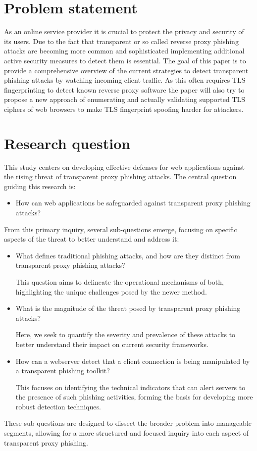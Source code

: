 \documentclass[12pt]{scrbook}
\begin{document}
\newpage \section{Problem statement} As an online service provider
it is crucial to protect the privacy and security of its users. Due to the
fact that transparent or so called reverse proxy phishing attacks are
becoming more common and sophisticated implementing additional active
security measures to detect them is essential. The goal of this paper is to
provide a comprehensive overview of the current strategies to detect
transparent phishing attacks by watching incoming client traffic. As this
often requires TLS fingerprinting to detect known reverse proxy software the
paper will also try to propose a new approach of enumerating and actually
validating supported TLS ciphers of web browsers to make TLS fingerprint
spoofing harder for attackers.

\section{Research question}
This study centers on developing effective defenses for web applications against the rising threat of transparent proxy phishing attacks. The central question guiding this research is:
\begin{itemize}
    \item How can web applications be safeguarded against transparent proxy phishing attacks?
\end{itemize}
From this primary inquiry, several sub-questions emerge, focusing on specific aspects of the threat to better understand and address it:
\begin{itemize}
    \item What defines traditional phishing attacks, and how are they distinct from transparent proxy phishing attacks?

    This question aims to delineate the operational mechanisms of both, highlighting the unique challenges posed by the newer method.
    \item What is the magnitude of the threat posed by transparent proxy phishing attacks?

    Here, we seek to quantify the severity and prevalence of these attacks to better understand their impact on current security frameworks.
    \item How can a webserver detect that a client connection is being manipulated by a transparent phishing toolkit?

    This focuses on identifying the technical indicators that can alert servers to the presence of such phishing activities, forming the basis for developing more robust detection techniques.
\end{itemize}
These sub-questions are designed to dissect the broader problem into manageable segments, allowing for a more structured and focused inquiry into each aspect of transparent proxy phishing.
\end{document}
